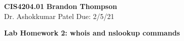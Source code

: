\noindent
\textbf{CIS4204.01} \hfill \textbf{Brandon Thompson} \\
\normalsize Dr. Ashokkumar Patel \hfill Due: 2/5/21\\

\begin{center}
\textbf{Lab Homework 2: whois and nslookup commands}
\end{center}